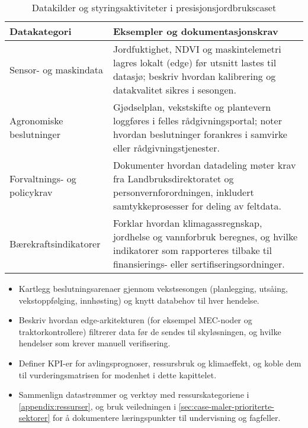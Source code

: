 \begin{table}[h]
    \centering
    \caption{Datakilder og styringsaktiviteter i presisjonsjordbrukscaset}
    \label{tab:landbruk-datakilder}
    \begin{tabular}{p{3.5cm}p{8.5cm}}
        \toprule
        Datakategori & Eksempler og dokumentasjonskrav \\
        \midrule
        Sensor- og maskindata & Jordfuktighet, NDVI og maskintelemetri lagres lokalt (edge) før utsnitt lastes til datasjø; beskriv hvordan kalibrering og datakvalitet sikres i sesongen. \\
        Agronomiske beslutninger & Gjødselplan, vekstskifte og plantevern loggføres i felles rådgivningsportal; noter hvordan beslutninger forankres i samvirke eller rådgivningstjenester. \\
        Forvaltnings- og policykrav & Dokumenter hvordan datadeling møter krav fra Landbruksdirektoratet og personvernforordningen, inkludert samtykkeprosesser for deling av feltdata. \\
        Bærekraftsindikatorer & Forklar hvordan klimagassregnskap, jordhelse og vannforbruk beregnes, og hvilke indikatorer som rapporteres tilbake til finansierings- eller sertifiseringsordninger. \\
        \bottomrule
    \end{tabular}
\end{table}

\begin{itemize}
    \item Kartlegg beslutningsarenaer gjennom vekstsesongen (planlegging, utsåing, vekstoppfølging, innhøsting) og knytt databehov til hver hendelse.\citep{landbruksdir2023digitalisering}
    \item Beskriv hvordan edge-arkitekturen (for eksempel MEC-noder og traktorkontrollere) filtrerer data før de sendes til skyløsningen, og hvilke hendelser som krever manuell verifisering.\citep{etsi2023mec}
    \item Definer KPI-er for avlingsprognoser, ressursbruk og klimaeffekt, og koble dem til vurderingsmatrisen for modenhet i dette kapittelet.
    \item Sammenlign datastrømmer og verktøy med ressurskategoriene i \autoref{appendix:ressurser}, og bruk veiledningen i \autoref{sec:case-maler-prioriterte-sektorer} for å dokumentere læringspunkter til undervisning og fagfeller.
\end{itemize}

